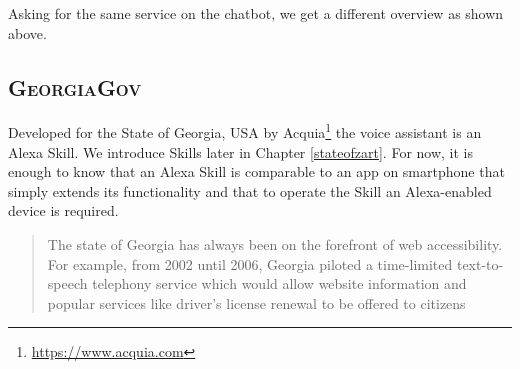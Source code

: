 
\noindent Asking for the same service on the chatbot, we get a %
different overview as shown above. %
%



\subsection*{\textsc{GeorgiaGov}}
\label{georgiastuff}
Developed for the State of Georgia, USA by Acquia\footnote{\url{https://www.acquia.com}} the voice assistant is an Alexa Skill. We introduce Skills later in Chapter \ref{stateofzart}. %
For now, it is enough to know that an Alexa Skill is comparable to an app on smartphone that simply extends its functionality and that to operate the Skill an Alexa-enabled device is required.

\begin{quotation}
	\noindent The state of Georgia has always been on the forefront of web accessibility. For example, from 2002 until 2006, Georgia piloted a time-limited text-to-speech telephony service which would allow website information and popular services like driver's license renewal to be offered to citizens \cite{dries:georgia}
\end{quotation} 


